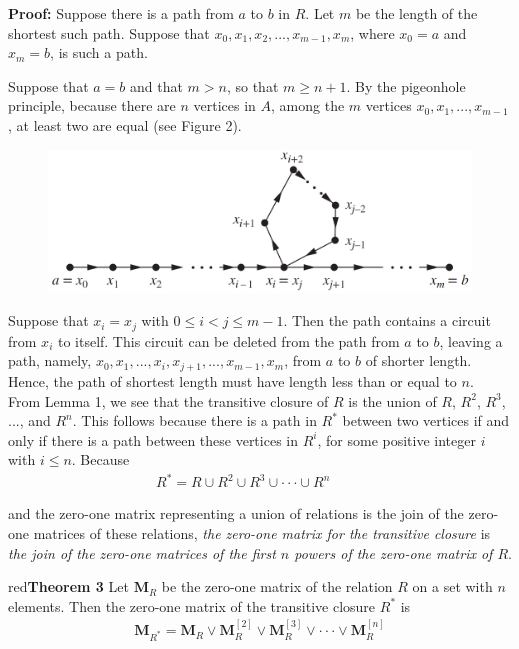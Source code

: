 \documentclass[11pt]{article}
\newenvironment{theorem}[1]{\begin{mybox}{red}{\textbf{Theorem #1}}}{\end{mybox}}
\begin{document}
\textbf{Proof:} Suppose there is a path from $a$ to $b$ in $R$. Let $m$ be the length of the shortest such path. Suppose that $x_0, x_1, x_2, ..., x_{m-1}, x_m$, where $x_0 = a$ and $x_m = b$, is such a path. 

Suppose that $a = b$ and that $m > n$, so that $m \geq n + 1$. By the pigeonhole principle, because there are $n$ vertices in $A$, among the $m$ vertices $x_0, x_1, ..., x_{m-1}$, at least two are equal (see
Figure 2).

\begin{figure}[!h]
    \centering
    \includegraphics[width=.8\textwidth]{img/ch9.4-figure2.png}
    \label{fig:my_label}
\end{figure}

Suppose that $x_i = x_j$ with $0 \leq i < j \leq m - 1$. Then the path contains a circuit from $x_i$ to itself. This circuit can be deleted from the path from $a$ to $b$, leaving a path, namely, $x_0, x_1, ..., x_i, x_{j+1}, ..., x_{m-1}, x_m$, from $a$ to $b$ of shorter length. Hence, the path of shortest length must have length less than or equal to $n$.\\

From Lemma 1, we see that the transitive closure of $R$ is the union of $R$, $R^2$, $R^3$, ..., and $R^n$. This follows because there is a path in $R^*$ between two vertices if and only if there is a path between these vertices in $R^i$, for some positive integer $i$ with $i \leq n$. Because
\begin{align*}
    R^* = R \cup R^2 \cup R^3 \cup \cdot \cdot \cdot \cup R^n & & &
\end{align*}

\noindent and the zero-one matrix representing a union of relations is the join of the zero-one matrices of these relations, \textit{the zero-one matrix for the transitive closure} is \textit{the join of the zero-one matrices
of the first $n$ powers of the zero-one matrix of $R$}.

\begin{theorem}{3}
Let $\mathbf{M}_R$ be the zero-one matrix of the relation $R$ on a set with $n$ elements. Then the zero-one matrix of the transitive closure $R^*$ is
\begin{align*}
    \mathbf{M}_{R^*} = \mathbf{M}_R \lor \mathbf{M}_R^{[2]} \lor \mathbf{M}_R^{[3]} \lor \cdot \cdot \cdot \lor \mathbf{M}_R^{[n]}    
\end{align*}
\end{theorem}
\end{document}
